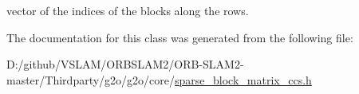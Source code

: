 vector of the indices of the blocks along the rows. 



The documentation for this class was generated from the following file\+:\begin{DoxyCompactItemize}
\item 
D\+:/github/\+V\+S\+L\+A\+M/\+O\+R\+B\+S\+L\+A\+M2/\+O\+R\+B-\/\+S\+L\+A\+M2-\/master/\+Thirdparty/g2o/g2o/core/\mbox{\hyperlink{sparse__block__matrix__ccs_8h}{sparse\+\_\+block\+\_\+matrix\+\_\+ccs.\+h}}\end{DoxyCompactItemize}
